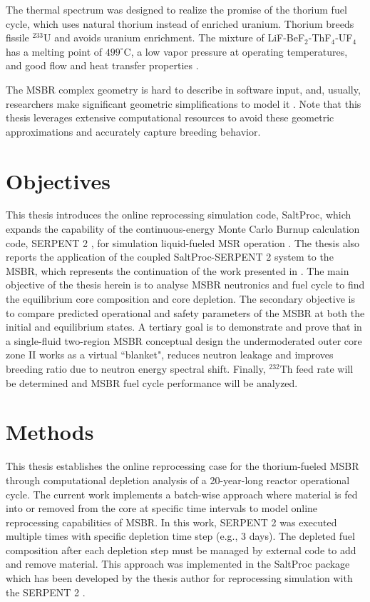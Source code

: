 The thermal spectrum  was designed to realize the promise of the thorium fuel cycle, which uses natural thorium instead of enriched uranium. Thorium breeds fissile $^{233}$U and avoids uranium enrichment. The mixture of LiF-BeF$_2$-ThF$_4$-UF$_4$ has a melting point of $499^\circ$C, a low vapor pressure at operating temperatures, and good flow and heat transfer properties \cite{robertson_conceptual_1971}. 

The \gls{MSBR} complex geometry is hard to describe in software input, and, usually, researchers make significant geometric simplifications to model it \cite{park_whole_2015}. Note that this thesis leverages extensive computational resources to avoid these geometric approximations and accurately capture breeding behavior.

\section{Objectives}
This thesis introduces the online reprocessing simulation code, SaltProc, which expands the capability of the continuous-energy Monte Carlo Burnup calculation code, SERPENT 2 \cite{leppanen_serpent_2015}, for simulation liquid-fueled \gls{MSR} operation \cite{andrei_rykhlevskii_arfc/saltproc:_2018}. The thesis also reports the application of the coupled SaltProc-SERPENT 2 system to the \gls{MSBR}, which represents the continuation of the work presented in \cite{rykhlevskii_full-core_2017, rykhlevskii_online_2017}. The main objective of the thesis herein is to analyse \gls{MSBR} neutronics and fuel cycle to find the equilibrium core composition and core depletion. The secondary objective is to compare predicted operational and safety parameters of the \gls{MSBR} at both the initial and equilibrium states. A tertiary goal is to demonstrate and prove that in a single-fluid two-region \gls{MSBR} conceptual design the undermoderated outer core zone II works as a virtual ``blanket", reduces neutron leakage and improves breeding ratio due to neutron energy spectral shift. Finally, $^{232}$Th feed rate will be determined and \gls{MSBR} fuel cycle performance will be analyzed.

\section{Methods}
This thesis establishes the online reprocessing case for the thorium-fueled \gls{MSBR} through computational depletion analysis of a 20-year-long reactor operational cycle. The current work implements a batch-wise approach where material is fed into or removed from the core at specific time intervals to model online reprocessing capabilities of \gls{MSBR}. In this work, SERPENT 2 was executed multiple times with specific depletion time step (e.g., 3 days). The depleted fuel composition after each depletion step  must be managed by external code to add and remove material. This approach was implemented in the SaltProc package \cite{andrei_rykhlevskii_arfc/saltproc:_2018} which has been developed by the thesis author for reprocessing simulation with the SERPENT 2 \cite{leppanen_serpent_2015}. 

